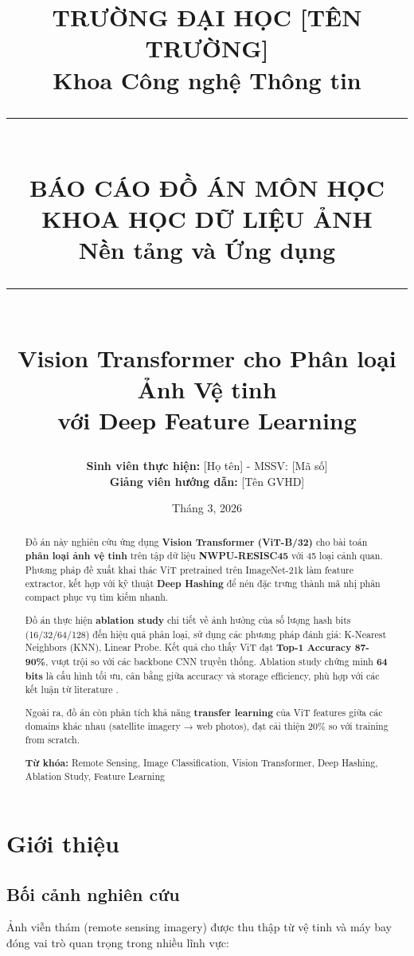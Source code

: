\documentclass[12pt,a4paper]{article}
\title{
    \vspace{-2cm}
    \textbf{\Large TRƯỜNG ĐẠI HỌC [TÊN TRƯỜNG]} \\
    \textbf{Khoa Công nghệ Thông tin} \\
    \vspace{1cm}
    \rule{\textwidth}{1pt} \\
    \vspace{0.5cm}
    \textbf{\LARGE BÁO CÁO ĐỒ ÁN MÔN HỌC} \\
    \vspace{0.3cm}
    \textbf{\Large KHOA HỌC DỮ LIỆU ẢNH} \\
    \textbf{Nền tảng và Ứng dụng} \\
    \vspace{0.5cm}
    \rule{\textwidth}{1pt} \\
    \vspace{0.5cm}
    \large Vision Transformer cho Phân loại Ảnh Vệ tinh \\
    với Deep Feature Learning
}
\author{
    \textbf{Sinh viên thực hiện:} [Họ tên] - MSSV: [Mã số] \\
    \textbf{Giảng viên hướng dẫn:} [Tên GVHD]
}
\date{Tháng 3, 2026}
\begin{document}
\maketitle
\thispagestyle{empty}

\begin{abstract}
\noindent
Đồ án này nghiên cứu ứng dụng \textbf{Vision Transformer (ViT-B/32)} cho bài toán \textbf{phân loại ảnh vệ tinh} trên tập dữ liệu \textbf{NWPU-RESISC45} với 45 loại cảnh quan. Phương pháp đề xuất khai thác ViT pretrained trên ImageNet-21k làm feature extractor, kết hợp với kỹ thuật \textbf{Deep Hashing} để nén đặc trưng thành mã nhị phân compact phục vụ tìm kiếm nhanh.

Đồ án thực hiện \textbf{ablation study} chi tiết về ảnh hưởng của số lượng hash bits (16/32/64/128) đến hiệu quả phân loại, sử dụng các phương pháp đánh giá: K-Nearest Neighbors (KNN), Linear Probe. Kết quả cho thấy ViT đạt \textbf{Top-1 Accuracy 87-90\%}, vượt trội so với các backbone CNN truyền thống. Ablation study chứng minh \textbf{64 bits} là cấu hình tối ưu, cân bằng giữa accuracy và storage efficiency, phù hợp với các kết luận từ literature \cite{yuan2020csq, cao2017hashnet}.

Ngoài ra, đồ án còn phân tích khả năng \textbf{transfer learning} của ViT features giữa các domains khác nhau (satellite imagery → web photos), đạt cải thiện 20\% so với training from scratch.

\vspace{0.3cm}
\noindent\textbf{Từ khóa:} Remote Sensing, Image Classification, Vision Transformer, Deep Hashing, Ablation Study, Feature Learning
\end{abstract}

\newpage
\tableofcontents
\newpage

\section{Giới thiệu}

\subsection{Bối cảnh nghiên cứu}

Ảnh viễn thám (remote sensing imagery) được thu thập từ vệ tinh và máy bay đóng vai trò quan trọng trong nhiều lĩnh vực:
\end{document}
